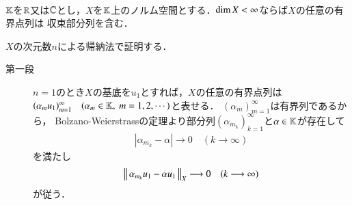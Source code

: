 \begin{screen}
	\begin{thm}\mbox{}\\
		$\mathbb{K}$を$\mathbb{R}$又は$\mathbb{C}$とし，$X$を$\mathbb{K}$上のノルム空間とする．$\operatorname{dim} X < \infty$ならば$X$の任意の有界点列は
		収束部分列を含む．
	\end{thm}
\end{screen}

\begin{prf}\mbox{}
	$X$の次元数$n$による帰納法で証明する．
	\begin{description}
		\item[第一段]
			$n=1$のとき$X$の基底を$u_1$とすれば，$X$の任意の有界点列は
			$( \alpha_m u_1)_{m=1}^{\infty} \quad (\alpha_m \in \mathbb{K},\ m=1,2,\cdots)$と表せる．
			$\left( \alpha_m \right)_{m=1}^{\infty}$は有界列であるから，
			Bolzano-Weierstrassの定理より部分列$\left( \alpha_{m_k} \right)_{k=1}^{\infty}$と$\alpha \in \mathbb{K}$が存在して
			\begin{align}
				\left| \alpha_{m_k} - \alpha \right| \longrightarrow 0 \quad (k \longrightarrow \infty)
			\end{align}
			を満たし
			\begin{align}
				\left\|\, \alpha_{m_k} u_1 - \alpha u_1\, \right\|_{X} \longrightarrow 0 \quad (k \longrightarrow \infty)
			\end{align}
			が従う．
		

\end{description}
\end{prf}
